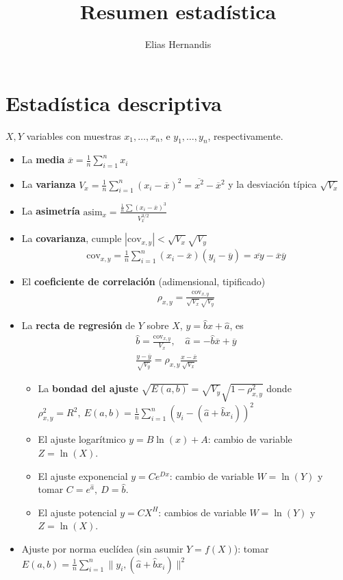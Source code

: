 \documentclass[a4paper,twocolumn]{extarticle}
\title{Resumen estadística}
\author{Elias Hernandis}
\theoremstyle{remark}
\newcommand{\xbarra}{\overline{x}}
\newcommand{\cov}{\text{cov}}
\begin{document}
\section{Estadística descriptiva}

$X,Y$ variables con muestras $x_1, \dots, x_n$, e $y_1, \dots, y_n$, respectivamente.
\begin{itemize}
	\item La \textbf{media} $\xbarra = \frac{1}{n}\sum_{i=1}^n x_i$
	\item La \textbf{varianza} $V_x = \frac{1}{n}\sum_{i=1}^n (x_i - \xbarra)^2 = \overline{x^2} - \xbarra^2$ y la desviación típica $\sqrt{V_x}$
	\item La \textbf{asimetría} $\text{asim}_x = \frac{\frac{1}{n}\sum (x_i - \xbarra)^3}{V_x^{3/2}}$
	\item La \textbf{covarianza}, cumple $
	|\cov_{x,y}| < \sqrt{V_x}\sqrt{V_y}$
	\begin{align*}
		\cov_{x,y} = \frac{1}{n}\sum_{i=1}^n (x_i - \xbarra)(y_i - \overline{y}) =\overline{xy} - \overline{x}\overline{y}
	\end{align*}
	\item El \textbf{coeficiente de correlación} (adimensional, tipificado)
	\begin{align*}
		\rho_{x,y} = \frac{\cov_{x,y}}{\sqrt{V_x}\sqrt{V_y}}
	\end{align*}
	\item La \textbf{recta de regresión} de $Y$ sobre $X$, $y = \hat{b}x + \hat{a}$, es
	\begin{align*}
		\hat{b} = \frac{\cov_{x,y}}{V_x},\quad \hat{a} = -\hat{b}\xbarra + \overline{y}\\
		\frac{y - \overline{y}}{\sqrt{V_y}} = \rho_{x,y} \frac{x - \xbarra}{\sqrt{V_x}}
	\end{align*}
	\begin{itemize}
		\item La \textbf{bondad del ajuste} $\sqrt{E(a,b)} = \sqrt{V_y}\sqrt{1 - \rho_{x,y}^2}$ donde $\rho_{x,y}^2 = R^2,\ E(a,b) = \frac{1}{n}\sum_{i=1}^n(y_i - (\hat{a}+\hat{b}x_i))^2$
		\item El ajuste logarítmico $y = B\ln(x) + A$: cambio de variable $Z = \ln(X)$.
		\item El ajuste exponencial $y = Ce^{Dx}$: cambio de variable $W = \ln(Y)$ y tomar $C = e^{\hat{a}},\ D = \hat{b}$.
		\item El ajuste potencial $y = CX^H$: cambios de variable $W = \ln(Y)$ y $Z = \ln(X)$.
	\end{itemize}
	\item Ajuste por norma euclídea (sin asumir $Y=f(X)$): tomar $E(a,b) = \frac{1}{n}\sum_{i=1}^n\lVert y_i, (\hat{a}+\hat{b}x_i)\rVert^2$
\end{itemize}
\end{document}
